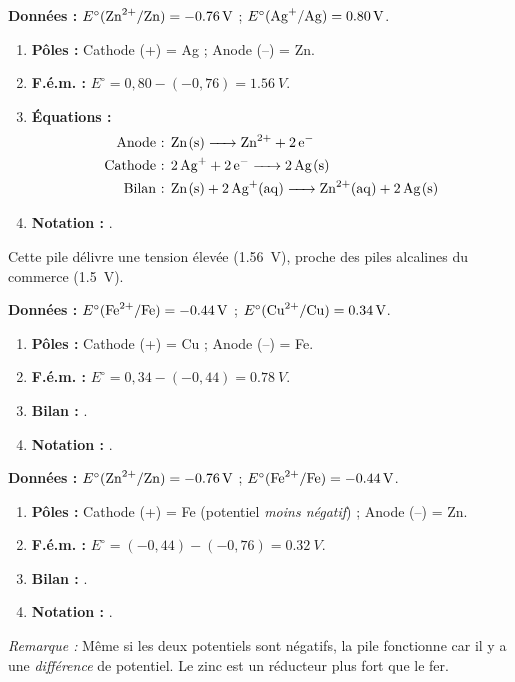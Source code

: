\documentclass[11pt]{article}
\newcommand{\cle}[1]{{\popxbold\color{popdark}#1}}
\begin{document}
\begin{exemplebox}
\textbf{Données :} \cle{$E^\circ(\ce{Zn^2+/Zn}) = \SI{-0,76}{V}$} ; \cle{$E^\circ(\ce{Ag+/Ag}) = \SI{+0,80}{V}$}.
\begin{enumerate}
    \item \textbf{Pôles :} Cathode (+) = Ag ; Anode (–) = Zn.
    \item \textbf{F.é.m. :} \cle{$E^\circ = 0,80 - (-0,76) = \SI{1,56}{V}$}.
    \item \textbf{Équations :}
    \begin{align*}
    \text{Anode : } & \ce{Zn(s) -> Zn^2+ + 2 e-} \\
    \text{Cathode : } & \ce{2 Ag+ + 2 e- -> 2 Ag(s)} \\
    \text{Bilan : } & \ce{Zn(s) + 2 Ag+(aq) -> Zn^2+(aq) + 2 Ag(s)}
    \end{align*}
    \item \textbf{Notation :} .
\end{enumerate}
Cette pile délivre une tension élevée (\SI{1,56}{V}), proche des piles alcalines du commerce (\SI{1,5}{V}).
\end{exemplebox}

\begin{exemplebox}
\textbf{Données :} \cle{$E^\circ(\ce{Fe^2+/Fe}) = \SI{-0,44}{V}$} ; \cle{$E^\circ(\ce{Cu^2+/Cu}) = \SI{+0,34}{V}$}.
\begin{enumerate}
    \item \textbf{Pôles :} Cathode (+) = Cu ; Anode (–) = Fe.
    \item \textbf{F.é.m. :} \cle{$E^\circ = 0,34 - (-0,44) = \SI{0,78}{V}$}.
    \item \textbf{Bilan :} .
    \item \textbf{Notation :} .
\end{enumerate}
\end{exemplebox}

\begin{exemplebox}
\textbf{Données :} \cle{$E^\circ(\ce{Zn^2+/Zn}) = \SI{-0,76}{V}$} ; \cle{$E^\circ(\ce{Fe^2+/Fe}) = \SI{-0,44}{V}$}.
\begin{enumerate}
    \item \textbf{Pôles :} Cathode (+) = Fe (potentiel \emph{moins négatif}) ; Anode (–) = Zn.
    \item \textbf{F.é.m. :} \cle{$E^\circ = (-0,44) - (-0,76) = \SI{0,32}{V}$}.
    \item \textbf{Bilan :} .
    \item \textbf{Notation :} .
\end{enumerate}
\emph{Remarque :} Même si les deux potentiels sont négatifs, la pile fonctionne car il y a une \emph{différence} de potentiel. Le zinc est un réducteur plus fort que le fer.
\end{exemplebox}
\end{document}
